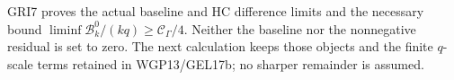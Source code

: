 GRI7 proves the actual baseline and HC difference limits and
the necessary bound $\liminf\mathcal B_k^0/(kq)\geq\mathcal C_\Gamma/4$.
Neither the baseline nor the nonnegative residual is set to zero.
The next calculation keeps those objects and the finite $q$-scale
terms retained in WGP13/GEL17b; no sharper remainder is assumed.